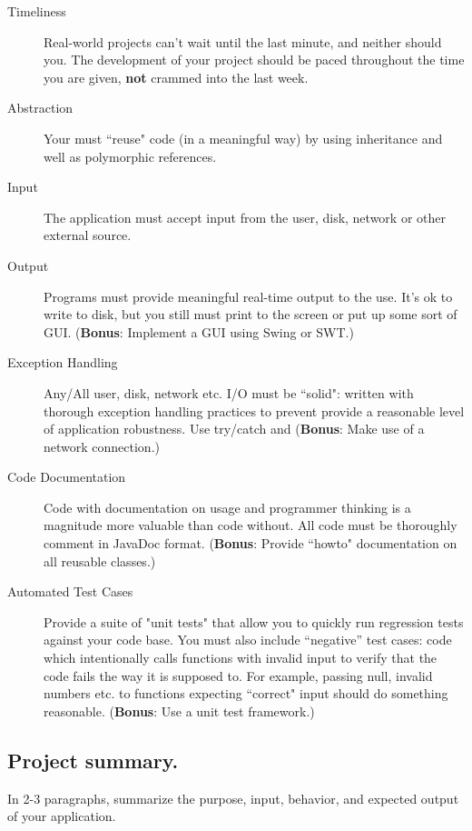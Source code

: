 \documentclass[12pt]{article}
\begin{document}
\begin{description}
\item[Timeliness] Real-world projects can't wait until the last minute, and neither should you. The development of your project should be paced throughout the time you are given, {\bf not} crammed into the last week.
\item[Abstraction] Your must ``reuse" code (in a meaningful way) by using inheritance and well as polymorphic references.
\item[Input] The application must accept input from the user, disk, network or other external source.
\item[Output] Programs must provide meaningful real-time output to the use. It's ok to write to disk, but you still must print to the screen or put up some sort of GUI. ({\bf Bonus}: Implement a GUI using Swing or SWT.)
\item[Exception Handling] Any/All user, disk, network etc. I/O must be ``solid": written with thorough exception handling practices to prevent provide a reasonable level of application robustness. Use try/catch and ({\bf Bonus}: Make use of a network connection.)
\item[Code Documentation] Code with documentation on usage and programmer thinking is a magnitude more valuable than code without. All code must be thoroughly comment in JavaDoc format. ({\bf Bonus}: Provide ``howto" documentation on all reusable classes.)
\item[Automated Test Cases] Provide a suite of "unit tests" that allow you to quickly run regression tests against your code base. You must also include ``negative'' test cases: code which intentionally calls functions with invalid input to verify that the code fails the way it is supposed to. For example, passing null, invalid numbers etc. to functions expecting ``correct" input should do something reasonable. ({\bf Bonus}: Use a unit test framework.) 
\end{description}

\subsection{Project summary.}
In 2-3 paragraphs, summarize the purpose, input, behavior, and expected output of your application.

\underline{\phantom{\hspace{5in}}}

\underline{\phantom{\hspace{5in}}}
\end{document}
